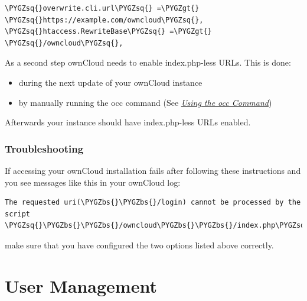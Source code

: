 \documentclass[letterpaper,10pt,english]{sphinxmanual}
\def\PYGZbs{\char`\\}
\def\PYGZgt{\char`\>}
\def\PYGZsq{\char`\'}
\renewcommand\PYGZsq{\textquotesingle}
\begin{document}
\begin{Verbatim}[commandchars=\\\{\}]
\PYGZsq{}overwrite.cli.url\PYGZsq{} =\PYGZgt{} \PYGZsq{}https://example.com/owncloud\PYGZsq{},
\PYGZsq{}htaccess.RewriteBase\PYGZsq{} =\PYGZgt{} \PYGZsq{}/owncloud\PYGZsq{},
\end{Verbatim}

As a second step ownCloud needs to enable index.php-less URLs. This is done:
\begin{itemize}
\item {} 
during the next update of your ownCloud instance

\item {} 
by manually running the occ command  (See {\hyperref[configuration_server/occ_command::doc]{\emph{\emph{Using the occ Command}}}})

\end{itemize}

Afterwards your instance should have index.php-less URLs enabled.


\subsection{Troubleshooting}
\label{configuration_server/index_php_less_urls:troubleshooting}
If accessing your ownCloud installation fails after following these instructions and you see
messages like this in your ownCloud log:

\begin{Verbatim}[commandchars=\\\{\}]
The requested uri(\PYGZbs{}\PYGZbs{}/login) cannot be processed by the script \PYGZsq{}\PYGZbs{}\PYGZbs{}/owncloud\PYGZbs{}\PYGZbs{}/index.php\PYGZsq{}
\end{Verbatim}

make sure that you have configured the two  options listed above correctly.


\chapter{User Management}
\label{configuration_user/index:user-management}\label{configuration_user/index::doc}
\end{document}
